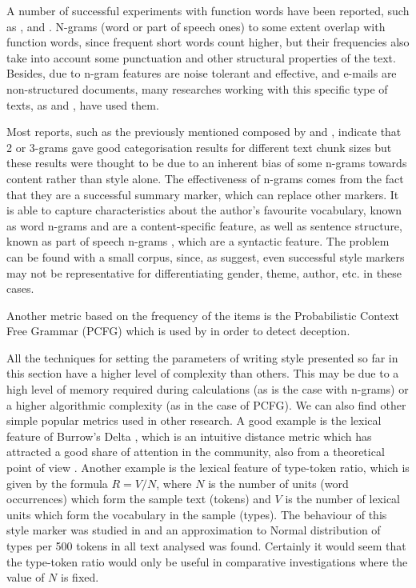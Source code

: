 A number of successful experiments with function words have been reported, such as \cite{craig1999authorial}, \cite{koppel2006feature} and \cite{de2001mining}. N-grams (word or part of speech ones) to some extent overlap with function words, since frequent short words count higher, but their frequencies also take into account some punctuation and other structural properties of the text. Besides, due to n-gram features are noise tolerant and effective, and e-mails are non-structured documents, many researches working with this specific type of texts, as \cite{brocardo2013authorship} and \cite{corney2001identifying}, have used them.

Most reports, such as the previously mentioned composed by \cite{kjell1994discrimination} and \cite{corney2001identifying}, indicate that 2 or 3-grams gave good categorisation results for different text chunk sizes but these results were thought to be due to an inherent bias of some n-grams towards content rather than style alone. The effectiveness of n-grams comes from the fact that they are a successful summary marker, which can replace other markers. It is able to capture characteristics about the author's favourite vocabulary, known as word n-grams \citep{diederich2003authorship} and are a content-specific feature, as well as sentence structure, known as part of speech n-grams \citep{baayen1996outside, argamon1998routing}, which are a syntactic feature. The problem can be found with a small corpus, since, as \cite{baayen2000back} suggest, even successful style markers may not be representative for differentiating gender, theme, author, etc. in these cases.

Another metric based on the frequency of the items is the Probabilistic Context Free Grammar (PCFG) which is used by \cite{cfgstylo} in order to detect deception.

All the techniques for setting the parameters of writing style presented so far in this section have a higher level of complexity than others. This may be due to a high level of memory required during calculations (as is the case with n-grams) or a higher algorithmic complexity (as in the case of PCFG). We can also find other simple popular metrics used in other research. A good example is the lexical feature of Burrow's Delta \citep{burrows2002delta}, which is an intuitive distance metric which has attracted a good share of attention in the community, also from a theoretical point of view \citep{argamon2008interpreting, hoover2004testing, hoover2004delta}. Another example is the lexical feature of type-token ratio, which is given by the formula $R=V/N$, where $N$ is the number of units (word occurrences) which form the sample text (tokens) and $V$ is the number of lexical units which form the vocabulary in the sample (types). The behaviour of this style marker was studied in \cite{kjetsaa1979and} and an approximation to Normal distribution of types per 500 tokens in all text analysed was found. Certainly it would seem that the type-token ratio would only be useful in comparative investigations where the value of $N$ is fixed.


